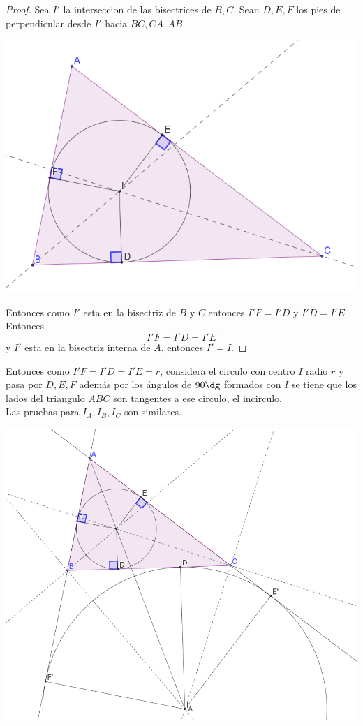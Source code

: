 \documentclass[11pt]{scrartcl}
\begin{document}
\begin{proof}
    Sea $I'$ la interseccion de las bisectrices de $B, C$.
    Sean $D,E,F$ los pies de perpendicular desde $I'$ hacia $BC,CA,AB$.
    
    \begin{center}
        \includegraphics[scale=0.8]{PNAC7.png}
    \end{center}
    
    Entonces como $I'$ esta en la bisectriz de $B$ y $C$ entonces $I'F=I'D$ y $I'D=I'E$ Entonces
    \[I'F=I'D=I'E\]
    y $I'$ esta en la bisectriz interna de $A$, entonces $I'=I$.
\end{proof}

Entonces como $I'F=I'D=I'E=r$, considera el circulo con centro $I$ radio $r$ y pasa por $D,E,F$ adem\'as por los 
\'angulos de $90\dg$ formados con $I$ se tiene que los lados del triangulo $ABC$ son tangentes a ese circulo, el incirculo. \\


Las pruebas para $I_A,I_B,I_C$ son similares.
    \begin{center}
        \includegraphics[scale=0.8]{PNAC8.png}
    \end{center}
\end{document}
